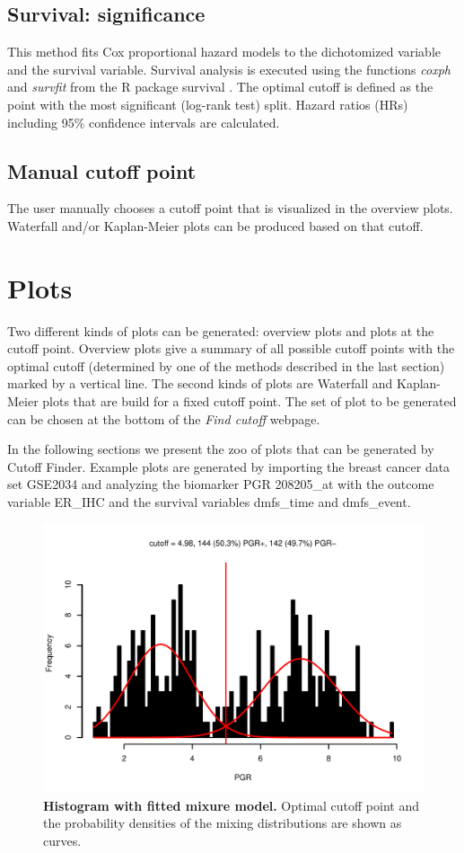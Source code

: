 \documentclass[12pt, a4paper]{article}
\begin{document}
\subsection{Survival: significance}
This method fits Cox proportional hazard models to the dichotomized variable and the survival variable.
Survival analysis is executed using the functions \emph{coxph} and \emph{survfit} from the R package survival \cite{survival}.
The optimal cutoff is defined as the point with the most significant (log-rank test) split.
Hazard ratios (HRs) including 95\% confidence intervals are calculated.

\subsection{Manual cutoff point}
The user manually chooses a cutoff point that is visualized in the overview plots.
Waterfall and/or Kaplan-Meier plots can be produced based on that cutoff.

\section{Plots}
Two different kinds of plots can be generated: overview plots and plots at the cutoff point.
Overview plots give a summary of all possible cutoff points with the optimal cutoff (determined by one of the methods described in the last section) marked by a vertical line.
The second kinds of plots are Waterfall and Kaplan-Meier plots that are build for a fixed cutoff point.
The set of plot to be generated can be chosen at the bottom of the \emph{Find cutoff} webpage.

In the following sections we present the zoo of plots that can be generated by Cutoff Finder.
Example plots are generated by importing the breast cancer data set GSE2034 and analyzing the
biomarker PGR 208205\_at with the outcome variable ER\_IHC and the survival variables
dmfs\_time and dmfs\_event.

\newpage

\begin{figure}[t]
\centering
\includegraphics{Cutoff_Finder_manual-002}
\caption{\textbf{Histogram with fitted mixure model.}
Optimal cutoff point and the probability densities of the mixing distributions are shown as curves.}
\label{fig:histogram}
\end{figure}
\end{document}
